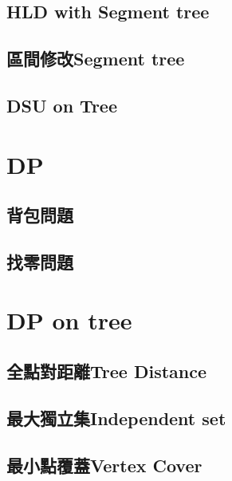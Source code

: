 \subsection{HLD with Segment tree}


\subsection{區間修改Segment tree}


\subsection{DSU on Tree}


\section{DP}

\subsection{背包問題}


\subsection{找零問題}


\section{DP on tree}

\subsection{全點對距離Tree Distance}


\subsection{最大獨立集Independent set}


\subsection{最小點覆蓋Vertex Cover}


